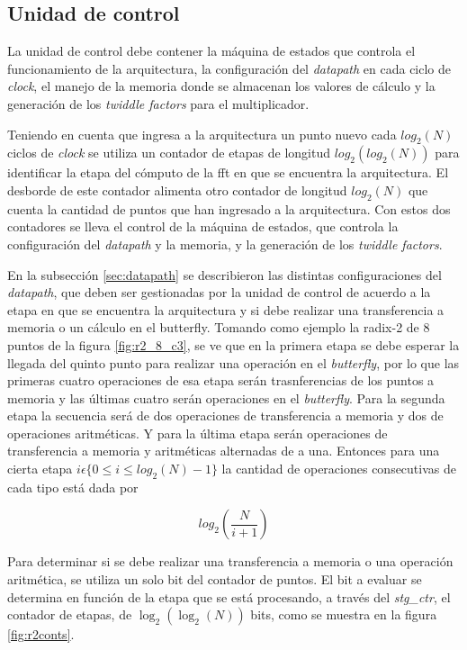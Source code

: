\subsection{Unidad de control}

La unidad de control debe contener la máquina de estados que controla el funcionamiento de la
arquitectura, la configuración del \textit{datapath} en cada ciclo de \textit{clock}, el manejo de
la memoria donde se almacenan los valores de cálculo y la generación de los \textit{twiddle factors}
para el multiplicador.

Teniendo en cuenta que ingresa a la arquitectura un punto nuevo cada $log_2(N)$ ciclos de
\textit{clock} se utiliza un contador de etapas de longitud $log_2(log_2(N))$ para identificar la
etapa del cómputo de la fft en que se encuentra la arquitectura. El desborde de este contador
alimenta otro contador de longitud  $log_2(N)$ que cuenta la cantidad de puntos que han ingresado a
la arquitectura. Con estos dos contadores se lleva el control de la máquina de estados, que controla
la configuración del \textit{datapath} y la memoria, y la generación de los \textit{twiddle
factors}.

En la subsección \ref{sec:datapath} se describieron las distintas configuraciones del \textit{datapath}, que
deben ser gestionadas por la unidad de control de acuerdo a la etapa en que se encuentra la
arquitectura y si debe realizar una transferencia a memoria o un cálculo en el butterfly. Tomando
como ejemplo la radix-2 de $8$ puntos de la figura \ref{fig:r2_8_c3}, se ve que en la primera etapa se debe esperar la llegada del quinto punto para realizar una operación en el \textit{butterfly}, por lo que las primeras cuatro operaciones de esa etapa serán trasnferencias de los puntos a memoria y las últimas cuatro serán operaciones en el
\textit{butterfly}. Para la segunda etapa la secuencia será de dos operaciones de transferencia a
memoria y dos de operaciones aritméticas. Y para la última etapa serán operaciones de transferencia
a memoria y aritméticas alternadas de a una. Entonces para una cierta etapa $i \epsilon \{0 \leq i
\leq log_2(N)-1\}$ la cantidad de operaciones consecutivas de cada tipo está dada por

\begin{equation}
log_2(\frac{N}{i+1})
\label{eq:etapas}
\end{equation}

Para determinar si se debe realizar una transferencia a memoria o una operación aritmética, se
utiliza un solo bit del contador de puntos. El bit a evaluar se determina en función de la etapa que
se está procesando, a través del \textit{stg\_ctr}, el contador de etapas, de $\log_2(\log_2(N))$
bits, como se muestra en la figura \ref{fig:r2conts}.

